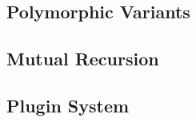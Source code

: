 \subsection{Polymorphic Variants}
\label{pv}


\subsection{Mutual Recursion}
\label{murec}

\subsection{Plugin System}

\label{plugins}
